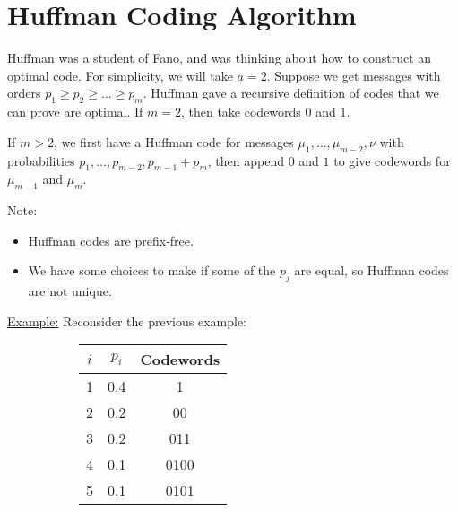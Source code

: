 \documentclass[10pt,a4paper]{article}
\begin{document}
\section{Huffman Coding Algorithm}
Huffman was a student of Fano, and was thinking about how to construct an optimal code. For simplicity, we will take $a = 2$. Suppose we get messages with orders $p_1 \geq p_2 \geq \ldots \geq p_m$. Huffman gave a recursive definition of codes that we can prove are optimal. If $m=2$, then take codewords $0$ and $1$.

If $m > 2$, we first have a Huffman code for messages $\mu_1, \ldots, \mu_{m-2}, \nu$ with probabilities $p_1, \ldots, p_{m-2}, p_{m-1}+p_m$, then append $0$ and $1$ to give codewords for $\mu_{m-1}$ and $\mu_m$.

\hspace*{-1em}Note:
\begin{itemize}
\item Huffman codes are prefix-free.
\item We have some choices to make if some of the $p_j$ are equal, so Huffman codes are not unique.
\end{itemize}
\hspace*{-1em}\underline{Example:} Reconsider the previous example:
\begin{figure}[H]
\begin{subfigure}{0.5\textwidth}
\end{subfigure}
\begin{subfigure}{0.5\textwidth}
\begin{tabular}{c|c|c}
$i$ & $p_i$ & Codewords \\\hline
1 & 0.4 & 1\\
2 & 0.2 & 00\\
3 & 0.2 & 011\\
4 & 0.1 & 0100\\
5 & 0.1 & 0101
\end{tabular}
\end{subfigure}
\end{figure}
\end{document}
